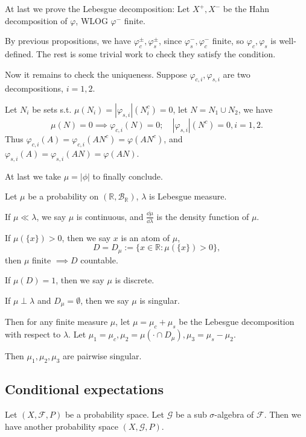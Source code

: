 At last we prove the Lebesgue decomposition:
Let $X^+, X^-$ be the Hahn decomposition of $\varphi$, WLOG  $\varphi^-$ finite.

By previous propositions, we have $\varphi_c^\pm, \varphi_s^\pm$,
since $\varphi_s^-, \varphi_c^-$ finite, so $\varphi_c, \varphi_s$ is well-defined.
The rest is some trivial work to check they satisfy the condition.

Now it remains to check the uniqueness.
Suppose $\varphi_{c, i}, \varphi_{s, i}$ are two decompositions, $i = 1, 2$.

Let $N_i$ be sets s.t. $\mu(N_i) = |\varphi_{s, i}|(N_i^c) = 0$,
let $N = N_1\cup N_2$, we have
\[
\mu(N) = 0 \implies  \varphi_{c, i}(N) = 0;\quad
|\varphi_{s, i}|(N^c) = 0, i = 1, 2.
\]
Thus $\varphi_{c, i}(A) = \varphi_{c, i}(AN^c) = \varphi(AN^c)$,
and $\varphi_{s, i}(A) = \varphi_{s, i}(AN) = \varphi(AN)$.

At last we take $\mu = |\phi|$ to finally conclude.

\begin{example}
    Let $\mu$ be a probability on $(\mathbb{R}, \mathcal{B}_{\mathbb{R}})$,
	$\lambda$ is Lebesgue measure.
 
	If $\mu \ll \lambda$, we say $\mu$ is continuous, and $\frac{\dd\mu}{\dd\lambda}$
	is the density function of $\mu$.

	If $\mu(\{x\}) > 0$, then we say $x$ is an atom of $\mu$,
	\[
	D = D_\mu := \{x\in \mathbb{R}: \mu(\{x\}) > 0\},
	\]
	then $\mu$ finite $ \implies D$ countable.

	If $\mu(D) = 1$, then we say $\mu$ is discrete.

	If $\mu \perp \lambda$ and $D_\mu = \emptyset$, then we say $\mu$ is singular.
\end{example}

Then for any finite measure $\mu$,
let $\mu = \mu_c + \mu_s$ be the Lebesgue decomposition with respect to $\lambda$. 
Let $\mu_1 = \mu_c, \mu_2 = \mu(\cdot \cap D_\mu), \mu_3 = \mu_s - \mu_2$.

Then $\mu_1, \mu_2, \mu_3$ are pairwise singular.

\subsection{Conditional expectations}
\label{sub:Conditional expectations}
Let $(X, \mathscr{F}, P)$ be a probability space.
Let $\mathscr{G}$ be a sub $\sigma$-algebra of $\mathscr{F}$.
Then we have another probability space $(X, \mathscr{G}, P)$.

